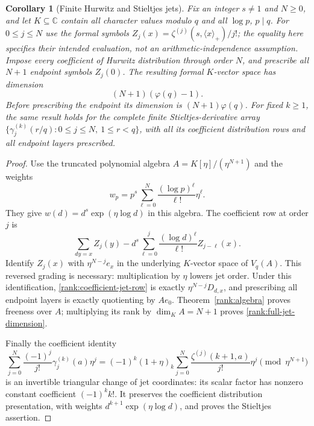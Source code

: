 \documentclass[11pt,a4paper]{article}
\newtheorem{corollary}[theorem]{Corollary}
\theoremstyle{definition}
\theoremstyle{remark}
\numberwithin{equation}{section}
\begin{document}
\begin{corollary}[Finite Hurwitz and Stieltjes jets]\label{rank:full-jets}
Fix an integer $s\ne1$ and $N\geq0$, and let $K\subseteq\mathbb C$
contain all character values modulo $q$ and all $\log p$, $p\mid q$.
For $0\leq j\leq N$ use the formal symbols
$Z_j(x)=\zeta^{(j)}(s,\langle x\rangle_+)/j!$; the equality here
specifies their intended evaluation, not an arithmetic-independence
assumption.  Impose every coefficient of Hurwitz distribution through
order $N$, and prescribe all $N+1$ endpoint symbols $Z_j(0)$.
The resulting formal $K$-vector space has dimension
\begin{equation}\label{rank:full-jet-dimension}
 (N+1)(\varphi(q)-1).
\end{equation}
Before prescribing the endpoint its dimension is $(N+1)\varphi(q)$.
For fixed $k\geq1$, the same result holds for the complete finite
Stieltjes-derivative array
$\{\gamma_j^{(k)}(r/q):0\leq j\leq N,\ 1\leq r<q\}$,
with all its coefficient distribution rows and all endpoint layers
prescribed.
\end{corollary}
\begin{proof}
Use the truncated polynomial algebra $A=K[\eta]/(\eta^{N+1})$ and
the weights
\[
 w_p=p^s\sum_{\ell=0}^N\frac{(\log p)^\ell}{\ell!}\eta^\ell.
\]
They give $w(d)=d^s\exp(\eta\log d)$ in this algebra.  The coefficient
row at order $j$ is
\begin{equation}\label{rank:coefficient-jet-row}
 \sum_{dy=x}Z_j(y)
 -d^s\sum_{\ell=0}^j
       \frac{(\log d)^\ell}{\ell!}Z_{j-\ell}(x).
\end{equation}
Identify $Z_j(x)$ with $\eta^{N-j}e_x$ in the underlying $K$-vector
space of $V_q(A)$.  This reversed grading is necessary: multiplication
by $\eta$ lowers jet order.  Under this identification,
\eqref{rank:coefficient-jet-row} is exactly $\eta^{N-j}D_{d,x}$,
and prescribing all endpoint layers is exactly quotienting by $Ae_0$.
Theorem~\ref{rank:algebra} proves freeness over $A$; multiplying its
rank by $\dim_K A=N+1$ proves \eqref{rank:full-jet-dimension}.

Finally the coefficient identity
\[
 \sum_{j=0}^N\frac{(-1)^j}{j!}\gamma_j^{(k)}(a)\eta^j
 =(-1)^k(1+\eta)_k
       \sum_{j=0}^N\frac{\zeta^{(j)}(k+1,a)}{j!}\eta^j
       \pmod{\eta^{N+1}}
\]
is an invertible triangular change of jet coordinates: its scalar
factor has nonzero constant coefficient $(-1)^k k!$.  It preserves
the coefficient distribution presentation, with weights
$d^{k+1}\exp(\eta\log d)$, and proves the Stieltjes assertion.
\end{proof}
\end{document}
